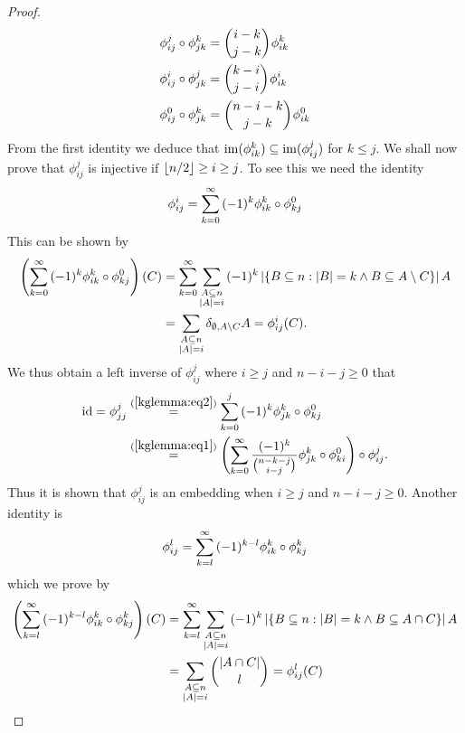 \documentclass[a4paper]{article}
\begin{document}
\begin{proof}
\begin{align}
      \phi^j_{ij}\compose\phi^k_{jk} & = \binom{i-k}{j-k}\phi^k_{ik}\\
      \phi^i_{ij}\compose\phi^j_{jk} & = \binom{k-i}{j-i}\phi^i_{ik}\\
      \phi^0_{ij}\compose\phi^k_{jk} & = \binom{n-i-k}{j-k}\phi^0_{ik}\label{kglemma:eq1}
  \end{align}
  From the first identity we deduce that $\mathop\mathrm{im}(\phi^k_{ik})\subseteq\mathop\mathrm{im}(\phi^j_{ij})$ for $k\leq j$.
  We shall now prove that $\phi^j_{ij}$ is injective if $\left\lfloor n/2\right\rfloor\geq i\geq j$.
  To see this we need the identity
  \begin{align}
      \phi^i_{ij}=\sum_{k=0}^{\infty}{(-1)^k\phi^k_{ik}\circ\phi^0_{kj}}\label{kglemma:eq2}
  \end{align}
  This can be shown by
  \begin{align*}
      \left(\sum_{k=0}^{\infty}{(-1)^k\phi^k_{ik}\circ\phi^0_{kj}}\right)(C)
      & = \sum_{k=0}^{\infty}\sum_{\substack{A\subseteq n\\ \left|A\right|=i}}{(-1)^k\left|\{B\subseteq
              n:\left|B\right|=k\wedge  B\subseteq A\setminus C\}\right|A}\\
      & = \sum_{\substack{A\subseteq n\\ \left|A\right|=i}}{\delta_{\emptyset,A\setminus C}A} = \phi^i_{ij}(C)\text{.}
  \end{align*}
  We thus obtain a left inverse of $\phi^j_{ij}$ where $i\geq j$ and $n-i-j\geq 0$ that
  \begin{align*}
      \id=\phi^j_{jj}
      & \stackrel{(\ref{kglemma:eq2})}{=} \sum_{k=0}^{j}{(-1)^k\phi^k_{jk}\compose\phi^0_{kj}}\\
      & \stackrel{(\ref{kglemma:eq1})}{=} \left(\sum_{k=0}^{\infty}{\frac{(-1)^k}{\binom{n-k-j}{i-j}}\phi^k_{jk}\compose\phi^0_{ki}}\right)\compose\phi^j_{ij}\text{.}
  \end{align*}
  Thus it is shown that $\phi^j_{ij}$ is an embedding when $i\geq j$ and $n-i-j\geq 0$.
  Another identity is
  \begin{align*}
      \phi^l_{ij}=\sum_{k=l}^{\infty}{(-1)^{k-l}\phi^k_{ik}\circ\phi^k_{kj}}
  \end{align*}
  which we prove by
  \begin{align*}
      \left(\sum_{k=l}^{\infty}{(-1)^{k-l}\phi^k_{ik}\compose\phi^k_{kj}}\right)(C)
      & = \sum_{k=l}^{\infty}\sum_{\substack{A\subseteq n\\ \card{A}=i}}{(-1)^k\card{\{B\subseteq n:\card{B}=k\lgand  B\subseteq A\setmeet C\}}A}\\
      & = \sum_{\substack{A\subseteq n\\ \card{A}=i}}{\binom{\card{A\setmeet C}}{l}} = \phi_{ij}^l(C)
  \end{align*}  
\end{proof}
\end{document}
